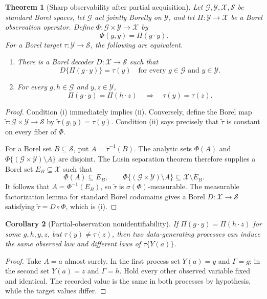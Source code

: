 \documentclass[11pt]{article}
\newtheorem{theorem}{Theorem}[section]
\newtheorem{corollary}[theorem]{Corollary}
\theoremstyle{definition}
\theoremstyle{remark}
\newcommand{\cX}{\mathcal X}
\newcommand{\cY}{\mathcal Y}
\newcommand{\cS}{\mathcal S}
\newcommand{\cG}{\mathcal G}
\newcommand{\1}{\mathbf 1}
\begin{document}
\begin{theorem}[Sharp observability after partial acquisition]
\label{thm:partial-observation}
Let \(\cG,\cY,\cX,\cS\) be standard Borel spaces, let \(\cG\) act jointly
Borelly on \(\cY\), and let \(\Pi:\cY\to\cX\) be a Borel observation
operator.  Define \(\Phi:\cG\times\cY\to\cX\) by
\[
  \Phi(g,y)=\Pi(g\cdot y).
\]
For a Borel target \(\tau:\cY\to\cS\), the following are equivalent.
\begin{enumerate}[label=(\roman*)]
  \item There is a Borel decoder \(D:\cX\to\cS\) such that
  \[
    D\{\Pi(g\cdot y)\}=\tau(y)
    \quad\text{for every }g\in\cG\text{ and }y\in\cY.
  \]
  \item For every \(g,h\in\cG\) and \(y,z\in\cY\),
  \[
    \Pi(g\cdot y)=\Pi(h\cdot z)
    \quad\Longrightarrow\quad
    \tau(y)=\tau(z).
  \]
\end{enumerate}
\end{theorem}

\begin{proof}
Condition (i) immediately implies (ii).  Conversely, define the Borel map
\(\widetilde\tau:\cG\times\cY\to\cS\) by
\(\widetilde\tau(g,y)=\tau(y)\).  Condition (ii) says precisely that
\(\widetilde\tau\) is constant on every fiber of \(\Phi\).

For a Borel set \(B\subseteq\cS\), put
\(A=\widetilde\tau^{-1}(B)\).  The analytic sets \(\Phi(A)\) and
\(\Phi\{(\cG\times\cY)\setminus A\}\) are disjoint.  The Lusin separation
theorem therefore supplies a Borel set \(E_B\subseteq\cX\) such that
\[
  \Phi(A)\subseteq E_B,
  \qquad
  \Phi\{(\cG\times\cY)\setminus A\}
  \subseteq\cX\setminus E_B.
\]
It follows that \(A=\Phi^{-1}(E_B)\), so \(\widetilde\tau\) is
\(\sigma(\Phi)\)-measurable.  The measurable factorization lemma for standard
Borel codomains gives a Borel \(D:\cX\to\cS\) satisfying
\(\widetilde\tau=D\circ\Phi\), which is (i).
\end{proof}

\begin{corollary}[Partial-observation nonidentifiability]
\label{cor:partial-nonid}
If \(\Pi(g\cdot y)=\Pi(h\cdot z)\) for some \(g,h,y,z\), but
\(\tau(y)\ne\tau(z)\), then two data-generating processes can induce the same
observed law and different laws of \(\tau\{Y(a)\}\).
\end{corollary}

\begin{proof}
Take \(A=a\) almost surely.  In the first process set \(Y(a)=y\) and
\(\Gamma=g\); in the second set \(Y(a)=z\) and \(\Gamma=h\).  Hold every
other observed variable fixed and identical.  The recorded value is the same
in both processes by hypothesis, while the target values differ.
\end{proof}
\end{document}

